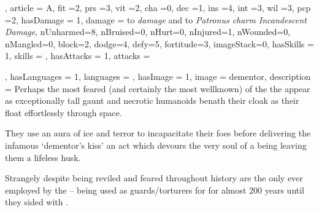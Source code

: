 {{


, article = A, fit =2, prs =3, vit =2, cha =0, dec =1, ins =4, int =3, wil =3, pcp =2, hasDamage = 1, damage = to \textit{ damage} and  to \textit{Patronus charm\comma{} Incandescent Damage}, nUnharmed=8, nBruised=0, nHurt=0, nInjured=1, nWounded=0, nMangled=0, block=2, dodge=4, defy=5, fortitude=3, imageStack=0, hasSkills = 1, skills = 
, hasAttacks = 1, attacks = 


, hasLanguages = 1, languages = , hasImage = 1, image = dementor, description = Perhaps the most feared (and certainly the most well\minus{}known) of the \comma{} the \name{} appear as exceptionally tall\comma{} gaunt and necrotic humanoids benath their cloak\comma{} as their float effortlessly through space. 

They use an aura of ice and terror to incapacitate their foes\comma{} before delivering the infamous `dementor’s kiss’\comma{} an act which devours the very soul of a being\comma{} leaving them a lifeless husk. 

Strangely\comma{} despite being reviled and feared throughout history\comma{}  are the only  ever employed by the  – being used as guards/torturers for  for almost 200 years\comma{} until they sided with .}


}
